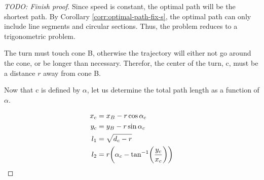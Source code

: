 \begin{proof}
[TODO: Finish proof]

Since speed is constant, the optimal path will be the shortest path. By Corollary \ref{corr:optimal-path-fix-s}, the optimal path can only include line segments and circular sections. Thus, the problem reduces to a trigonometric problem.

The turn must touch cone B, otherwise the trajectory will either not go around the cone, or be longer than necessary. Therefor, the center of the turn, c, must be a distance $r$ away from cone B.


Now that c is defined by $\alpha$, let us determine the total path length as a function of $\alpha$.


\begin{align*}
x_c& = x_B - r \cos{\alpha_c}\\
y_c& = y_B - r \sin{\alpha_c}\\
l_1& = \sqrt{d_c - r}\\
l_2& = r \paren{\alpha_c - \tan^{-1}\paren{\frac{y_c}{x_c}}}\\
\end{align*}
\end{proof}
